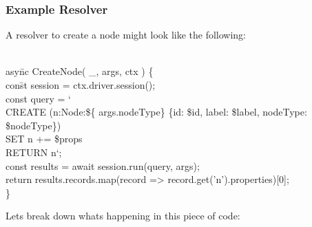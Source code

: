 \subsubsection{Example Resolver}
A resolver to create a node might look like the following:
\begin{exmp}
\label{ex241}
\begin{tabbing}
\\
asy\=nc CreateNode( \_, args, ctx ) \{ \\
\> con\=st session = ctx.driver.session(); \\
\> const query = ` \\
\> \> CREATE (n:Node:\$\{ args.nodeType\} \{id: \$id, label: \$label, nodeType: \$nodeType\}) \\
\> \> SET n += \$props \\
\> \> RETURN n`; \\
\> const results = await session.run(query, args); \\
\> return results.records.map(record => record.get('n').properties)[0]; \\
\}
\end{tabbing}
\end{exmp}
Lets break down whats happening in this piece of code:
